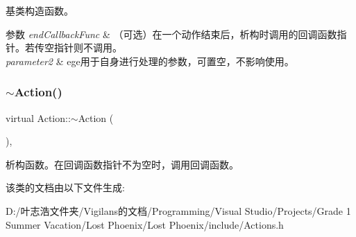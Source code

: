 基类构造函数。 


\begin{DoxyParams}{参数}
{\em end\+Callback\+Func} & （可选）在一个动作结束后，析构时调用的回调函数指针。若传空指针则不调用。\\
\hline
{\em parameter2} & ege用于自身进行处理的参数，可置空，不影响使用。 \\
\hline
\end{DoxyParams}
\mbox{\label{class_action_abcf4c6358f53a666631ace11b325a7cd}} 
\subsubsection{\texorpdfstring{$\sim$\+Action()}{~Action()}}
{\footnotesize\ttfamily virtual Action\+::$\sim$\+Action (\begin{DoxyParamCaption}{ }\end{DoxyParamCaption})\hspace{0.3cm}{\ttfamily [inline]}, {\ttfamily [virtual]}}



析构函数。在回调函数指针不为空时，调用回调函数。 



该类的文档由以下文件生成\+:\begin{DoxyCompactItemize}
\item 
D\+:/叶志浩文件夹/\+Vigilans的文档/\+Programming/\+Visual Studio/\+Projects/\+Grade 1 Summer Vacation/\+Lost Phoenix/\+Lost Phoenix/include/Actions.\+h\end{DoxyCompactItemize}
